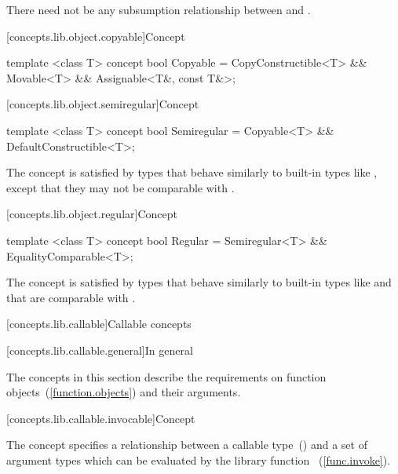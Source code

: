 \begin{itemdescr}
\pnum
There need not be any subsumption relationship between  and
.
\end{itemdescr}

[concepts.lib.object.copyable]{Concept }

%
\begin{itemdecl}
template <class T>
concept bool Copyable =
  CopyConstructible<T> &&
  Movable<T> &&
  Assignable<T&, const T&>;
\end{itemdecl}

[concepts.lib.object.semiregular]{Concept }

%
\begin{itemdecl}
template <class T>
concept bool Semiregular =
  Copyable<T> &&
  DefaultConstructible<T>;
\end{itemdecl}

\begin{itemdescr}
\pnum
\enternote The  concept is satisfied by types that
behave similarly to built-in types like , except that they may not be
comparable with \tcode{==}.\exitnote
\end{itemdescr}

[concepts.lib.object.regular]{Concept }

%
\begin{itemdecl}
template <class T>
concept bool Regular =
  Semiregular<T> &&
  EqualityComparable<T>;
\end{itemdecl}

\begin{itemdescr}
\pnum
\enternote The  concept is satisfied by types that behave
similarly to built-in types like  and that are comparable with \tcode{==}.\exitnote
\end{itemdescr}

[concepts.lib.callable]{Callable concepts}

[concepts.lib.callable.general]{In general}

\pnum
The concepts in this section describe the requirements on function
objects~(\ref{function.objects}) and their arguments.

[concepts.lib.callable.invocable]{Concept }

\pnum
The  concept specifies a relationship between a callable
type~()  and a set of argument types  which
can be evaluated by the library function ~(\ref{func.invoke}).

